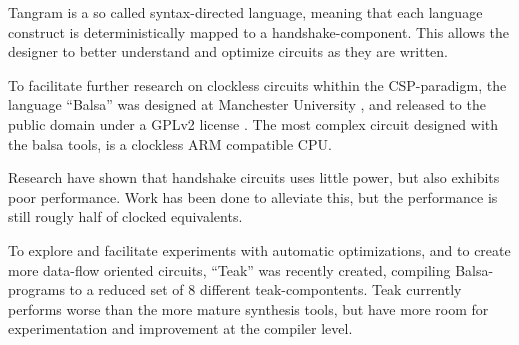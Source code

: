 Tangram is a so called syntax-directed language, meaning that each
language construct is deterministically mapped to a
handshake-component. This allows the designer to better understand and
optimize circuits as they are written.

To facilitate further research on clockless circuits whithin the
CSP-paradigm, the language ``Balsa'' was designed at Manchester
University \cite{xxx}, and released to the public domain under a GPLv2
license \cite{gpl}. The most complex circuit designed with the balsa
tools, is a clockless ARM\cite{arm} compatible CPU\cite{spa}.

Research have shown that handshake circuits uses little power\cite{xxx},
but also exhibits poor performance\cite{xxx}. Work has been done to
alleviate this\cite{xxx}, but the performance is still rougly half of
clocked equivalents.

To explore and facilitate experiments with automatic optimizations,
and to create more data-flow oriented circuits, ``Teak''\cite{teak}
was recently created, compiling Balsa-programs to a reduced set of 8
different teak-compontents. Teak currently performs worse than the
more mature synthesis tools, but have more room for experimentation
and improvement at the compiler level.



